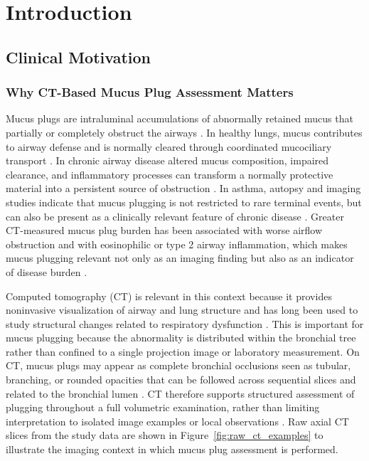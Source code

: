 \chapter{Introduction}

\section{Clinical Motivation}

\subsection{Why CT-Based Mucus Plug Assessment Matters}
Mucus plugs are intraluminal accumulations of abnormally retained mucus that partially or completely obstruct the airways \cite{fahy2010airwaymucus,dunican2018autopsy}. In healthy lungs, mucus contributes to airway defense and is normally cleared through coordinated mucociliary transport \cite{fahy2010airwaymucus}. In chronic airway disease altered mucus composition, impaired clearance, and inflammatory processes can transform a normally protective material into a persistent source of obstruction \cite{fahy2010airwaymucus,dunican2018autopsy}. In asthma, autopsy and imaging studies indicate that mucus plugging is not restricted to rare terminal events, but can also be present as a clinically relevant feature of chronic disease \cite{dunican2018autopsy}. Greater CT-measured mucus plug burden has been associated with worse airflow obstruction and with eosinophilic or type 2 airway inflammation, which makes mucus plugging relevant not only as an imaging finding but also as an indicator of disease burden \cite{dunican2018mucus}.


Computed tomography (CT) is relevant in this context because it provides noninvasive visualization of airway and lung structure and has long been used to study structural changes related to respiratory dysfunction \cite{dejong2005ctairways}. This is important for mucus plugging because the abnormality is distributed within the bronchial tree rather than confined to a single projection image or laboratory measurement. On CT, mucus plugs may appear as complete bronchial occlusions seen as tubular, branching, or rounded opacities that can be followed across sequential slices and related to the bronchial lumen \cite{dunican2018autopsy,dunican2018mucus}. CT therefore supports structured assessment of plugging throughout a full volumetric examination, rather than limiting interpretation to isolated image examples or local observations \cite{dejong2005ctairways,dunican2018mucus}. Raw axial CT slices from the study data are shown in Figure~\ref{fig:raw_ct_examples} to illustrate the imaging context in which mucus plug assessment is performed.

